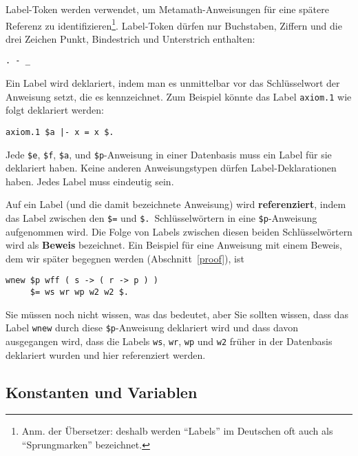Label-Token werden verwendet, um Metamath-Anweisungen für eine spätere Referenz zu identifizieren\footnote{Anm. der Übersetzer: deshalb werden "`Labels"' im Deutschen oft auch als "`Sprungmarken"' bezeichnet.}. Label-Token dürfen nur Buchstaben, Ziffern und die drei Zeichen Punkt, Bindestrich und Unterstrich enthalten:
\begin{verbatim}
. - _
\end{verbatim}

Ein Label wird deklariert, indem man es unmittelbar vor das Schlüsselwort der Anweisung setzt, die es kennzeichnet.  Zum Beispiel könnte das Label \texttt{axiom.1} wie folgt deklariert werden:
\begin{verbatim}
axiom.1 $a |- x = x $.
\end{verbatim}

Jede \texttt{\$e},
\texttt{\$f},
\texttt{\$a}, und
\texttt{\$p}-Anweisung in einer Datenbasis muss ein Label für sie deklariert haben.  Keine anderen Anweisungstypen dürfen Label-Deklarationen haben.  Jedes Label muss eindeutig sein.

Auf ein Label (und die damit bezeichnete Anweisung) wird {\bf referenziert}, indem das Label zwischen den \texttt{\$=} und \texttt{\$.}\ Schlüsselwörtern in eine \texttt{\$p}-Anweisung aufgenommen wird.  Die Folge von Labels zwischen diesen beiden Schlüsselwörtern wird als {\bf Beweis} bezeichnet.  Ein Beispiel für eine Anweisung mit einem Beweis, dem wir später begegnen werden (Abschnitt~\ref{proof}), ist
\begin{verbatim}
wnew $p wff ( s -> ( r -> p ) )
     $= ws wr wp w2 w2 $.
\end{verbatim}

Sie müssen noch nicht wissen, was das bedeutet, aber Sie sollten wissen, dass das Label \texttt{wnew} durch diese \texttt{\$p}-Anweisung deklariert wird und dass davon ausgegangen wird, dass die Labels \texttt{ws}, \texttt{wr}, \texttt{wp} und \texttt{w2} früher in der Datenbasis deklariert wurden und hier referenziert werden.

\subsection{Konstanten und Variablen}


